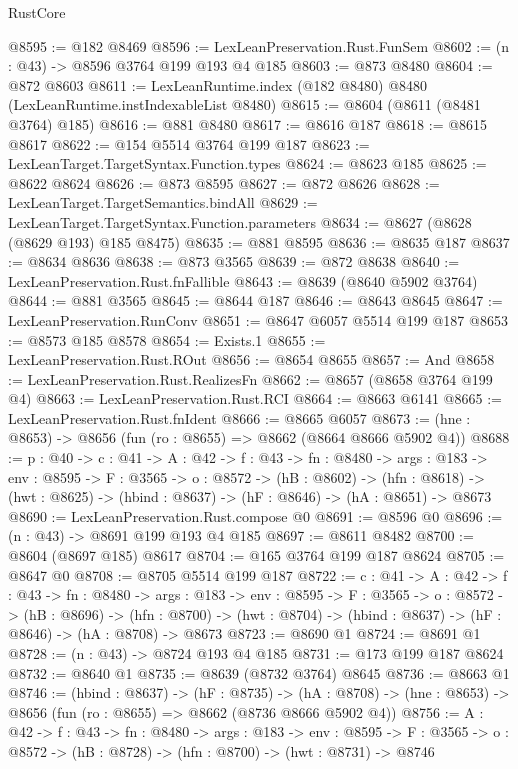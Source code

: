 \begin{lexlean}{RustCore}
\begin{coremodule}
@8595 := @182 @8469
@8596 := LexLeanPreservation.Rust.FunSem
@8602 := (n : @43) -> @8596 @3764 @199 @193 @4 @185
@8603 := @873 @8480
@8604 := @872 @8603
@8611 := LexLeanRuntime.index (@182 @8480) @8480 (LexLeanRuntime.instIndexableList @8480)
@8615 := @8604 (@8611 (@8481 @3764) @185)
@8616 := @881 @8480
@8617 := @8616 @187
@8618 := @8615 @8617
@8622 := @154 @5514 @3764 @199 @187
@8623 := LexLeanTarget.TargetSyntax.Function.types
@8624 := @8623 @185
@8625 := @8622 @8624
@8626 := @873 @8595
@8627 := @872 @8626
@8628 := LexLeanTarget.TargetSemantics.bindAll
@8629 := LexLeanTarget.TargetSyntax.Function.parameters
@8634 := @8627 (@8628 (@8629 @193) @185 @8475)
@8635 := @881 @8595
@8636 := @8635 @187
@8637 := @8634 @8636
@8638 := @873 @3565
@8639 := @872 @8638
@8640 := LexLeanPreservation.Rust.fnFallible
@8643 := @8639 (@8640 @5902 @3764)
@8644 := @881 @3565
@8645 := @8644 @187
@8646 := @8643 @8645
@8647 := LexLeanPreservation.RunConv
@8651 := @8647 @6057 @5514 @199 @187
@8653 := @8573 @185 @8578
@8654 := Exists.{1}
@8655 := LexLeanPreservation.Rust.ROut
@8656 := @8654 @8655
@8657 := And
@8658 := LexLeanPreservation.Rust.RealizesFn
@8662 := @8657 (@8658 @3764 @199 @4)
@8663 := LexLeanPreservation.Rust.RCI
@8664 := @8663 @6141
@8665 := LexLeanPreservation.Rust.fnIdent
@8666 := @8665 @6057
@8673 := (hne : @8653) -> @8656 (fun (ro : @8655) => @8662 (@8664 @8666 @5902 @4))
@8688 := {p : @40} ->
  {c : @41} ->
  {A : @42} ->
  {f : @43} ->
  {fn : @8480} ->
  {args : @183} ->
  {env : @8595} ->
  {F : @3565} ->
  {o : @8572} ->
  (hB : @8602) ->
  (hfn : @8618) -> (hwt : @8625) -> (hbind : @8637) -> (hF : @8646) -> (hA : @8651) -> @8673
@8690 := LexLeanPreservation.Rust.compose @0
@8691 := @8596 @0
@8696 := (n : @43) -> @8691 @199 @193 @4 @185
@8697 := @8611 @8482
@8700 := @8604 (@8697 @185) @8617
@8704 := @165 @3764 @199 @187 @8624
@8705 := @8647 @0
@8708 := @8705 @5514 @199 @187
@8722 := {c : @41} ->
  {A : @42} ->
  {f : @43} ->
  {fn : @8480} ->
  {args : @183} ->
  {env : @8595} ->
  {F : @3565} ->
  {o : @8572} ->
  (hB : @8696) ->
  (hfn : @8700) -> (hwt : @8704) -> (hbind : @8637) -> (hF : @8646) -> (hA : @8708) -> @8673
@8723 := @8690 @1
@8724 := @8691 @1
@8728 := (n : @43) -> @8724 @193 @4 @185
@8731 := @173 @199 @187 @8624
@8732 := @8640 @1
@8735 := @8639 (@8732 @3764) @8645
@8736 := @8663 @1
@8746 := (hbind : @8637) ->
  (hF : @8735) ->
  (hA : @8708) -> (hne : @8653) -> @8656 (fun (ro : @8655) => @8662 (@8736 @8666 @5902 @4))
@8756 := {A : @42} ->
  {f : @43} ->
  {fn : @8480} ->
  {args : @183} ->
  {env : @8595} ->
  {F : @3565} -> {o : @8572} -> (hB : @8728) -> (hfn : @8700) -> (hwt : @8731) -> @8746

\end{coremodule}
\end{lexlean}
